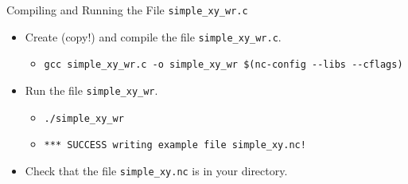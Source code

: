 \documentclass[compress,11pt,xcolor=svgnames,aspectratio=169]{beamer}
\begin{document}
\begin{frame}[fragile]{Compiling and Running the File \texttt{simple\_xy\_wr.c}}

\begin{itemize}
\setlength\itemsep{0.6cm}

  \item Create (copy!) and compile the file \verb|simple_xy_wr.c|.

    \begin{itemize}
      \item {\footnotesize \verb|gcc simple_xy_wr.c -o simple_xy_wr $(nc-config --libs --cflags)|}
    \end{itemize}

  \item Run the file \verb|simple_xy_wr|.

      \begin{itemize}
      \setlength\itemsep{0.2cm}
        \item {\footnotesize \verb|./simple_xy_wr|}
        \item {\footnotesize \verb|*** SUCCESS writing example file simple_xy.nc!|}
      \end{itemize}

  \item Check that the file \verb|simple_xy.nc| is in your directory.

\end{itemize}

\end{frame}
\end{document}
